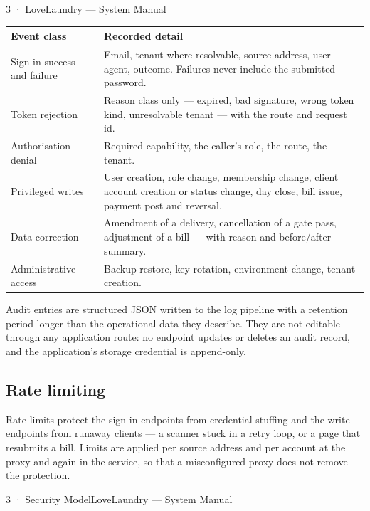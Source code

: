 \documentclass[11pt,a4paper,oneside]{book}
\begin{document}
3 · LoveLaundry — System Manual

\begin{center}\small
\begin{tabularx}{\linewidth}{|X|X|}
\hline
\rowcolor{lightgrey}
\textbf{Event class} & \textbf{Recorded detail} \\ \hline
Sign-in success and failure & Email, tenant where resolvable, source address, user agent, outcome. Failures never include the submitted password. \\ \hline
Token rejection & Reason class only — expired, bad signature, wrong token kind, unresolvable tenant — with the route and request id. \\ \hline
Authorisation denial & Required capability, the caller's role, the route, the tenant. \\ \hline
Privileged writes & User creation, role change, membership change, client account creation or status change, day close, bill issue, payment post and reversal. \\ \hline
Data correction & Amendment of a delivery, cancellation of a gate pass, adjustment of a bill — with reason and before/after summary. \\ \hline
Administrative access & Backup restore, key rotation, environment change, tenant creation. \\ \hline
\end{tabularx}
\end{center}
Audit entries are structured JSON written to the log pipeline with a retention period longer than the operational data they describe. They are not editable through any application route: no endpoint updates or deletes an audit record, and the application's storage credential is append-only.

\subsection*{Rate limiting}
Rate limits protect the sign-in endpoints from credential stuffing and the write endpoints from runaway clients — a scanner stuck in a retry loop, or a page that resubmits a bill. Limits are applied per source address and per account at the proxy and again in the service, so that a misconfigured proxy does not remove the protection.

3 · Security ModelLoveLaundry — System Manual
\end{document}
